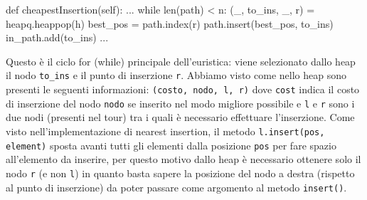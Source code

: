 \documentclass[a4paper,12pt]{report}
\begin{document}
\begin{python}
def cheapestInsertion(self):
  ...
  while len(path) < n:
    (_, to_ins, _, r) = heapq.heappop(h)
    best_pos = path.index(r)
    path.insert(best_pos, to_ins)
    in_path.add(to_ins)
    ...
\end{python}
Questo è il ciclo for (while) principale dell'euristica: viene selezionato dallo heap il nodo \lstinline!to_ins! e il punto di inserzione \lstinline!r!. Abbiamo visto come nello heap sono presenti le seguenti informazioni: \lstinline!(costo, nodo, l, r)! dove \lstinline!cost! indica il costo di inserzione del nodo \lstinline!nodo! se inserito nel modo migliore possibile e \lstinline!l! e \lstinline!r! sono i due nodi (presenti nel tour) tra i quali è necessario effettuare l'inserzione. Come visto nell'implementazione di nearest insertion, il metodo \lstinline!l.insert(pos, element)! sposta avanti tutti gli elementi dalla posizione \lstinline!pos! per fare spazio all'elemento da inserire, per questo motivo dallo heap è necessario ottenere solo il nodo \lstinline!r! (e non \lstinline!l!) in quanto basta sapere la posizione del nodo a destra (rispetto al punto di inserzione) da poter passare come argomento al metodo \lstinline!insert()!.
\end{document}
